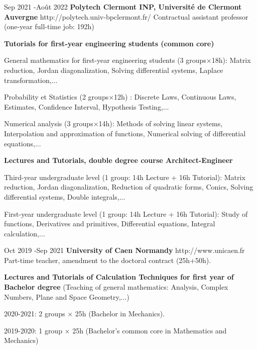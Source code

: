 \documentclass[10pt]{article} %
\begin{document}
\job
{Sep 2021 -}{Août 2022}
{\textbf{Polytech Clermont INP, Université de Clermont Auvergne}}
{http://polytech.univ-bpclermont.fr/}
{Contractual assistant professor (one-year full-time job: 192h)}
{
	\begin{itemize-noindent}
		\item{	\textbf{Tutorials for first-year engineering students (common core)}}
		\begin{itemize-noindent}
			\item{ General mathematics for first-year engineering students (3 groups$\times$18h): Matrix reduction, Jordan diagonalization, Solving differential systems, Laplace transformation,... }
			\item{ Probability et Statistics (2 groups$\times$12h) : Discrete Laws, Continuous Laws, Estimates, Confidence Interval, Hypothesis Testing,...}
         \item{ Numerical analysis (3 groups$\times$14h): Methods of solving linear systems, Interpolation and approximation of functions, Numerical solving of differential equations,...}
		\end{itemize-noindent}
    \item{ \textbf{Lectures and Tutorials, double degree course Architect-Engineer}}
		\begin{itemize-noindent}
\item{Third-year undergraduate level (1 group: 14h Lecture + 16h Tutorial): Matrix reduction, Jordan diagonalization, Reduction of quadratic forms, Conics, Solving differential systems, Double integrals,... }
\item{First-year undergraduate level (1 group: 14h Lecture + 16h Tutorial): Study of functions, Derivatives and primitives, Differential equations, Integral calculation,... }
		\end{itemize-noindent}	
\end{itemize-noindent}
}

\job
{Oct 2019 -}{Sep 2021}
{\textbf{University  of Caen Normandy}}
{http://www.unicaen.fr}
{Part-time teacher, amendment to the doctoral contract (25h+50h).}
{\begin{itemize-noindent}
\item{\textbf{Lectures and Tutorials of Calculation Techniques for first year of Bachelor degree} (Teaching of general mathematics: Analysis, Complex Numbers, Plane and Space Geometry,...)}
	\begin{itemize-noindent}
\item{2020-2021: 2 groups $\times$ 25h (Bachelor in Mechanics).}
\item{2019-2020: 1 group $\times$ 25h (Bachelor's common core in Mathematics and Mechanics)}
	\end{itemize-noindent}
\end{itemize-noindent}}
\end{document}
